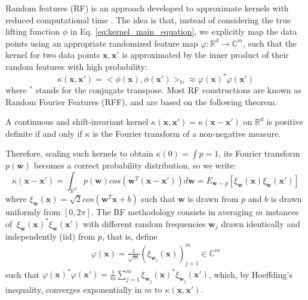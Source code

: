 \documentclass{article}
\begin{document}
Random features (RF) is an approach developed to approximate kernels with reduced computational time  \cite{rahimi2008random}. The idea is that, instead of considering the true lifting function $\phi$ in Eq. \ref{eq:kernel_main_equation}, we explicitly map the data points using an appropriate randomized feature map $\varphi:\mathbb{R}^d \xrightarrow{}\mathbb{C}^m$, such that the kernel for two data points $\mathbf{x}, \mathbf{x}'$ is approximated by the inner product of their random features with high probability:
\begin{equation}
\label{eq:approx_RF}
\kappa(\mathbf{x},\mathbf{x}')=<\phi(\mathbf{x}),\phi(\mathbf{x}')>_\mathbb{H} \approx \varphi(\mathbf{x})^*\varphi(\mathbf{x}')
\end{equation}
where $^*$ stands for the conjugate transpose. Most RF constructions are known as Random Fourier Features (RFF), and are based on
the following theorem.
\begin{theorem}
	A continuous and shift-invariant kernel $\kappa(\mathbf{x},\mathbf{x}')=\kappa(\mathbf{x}-\mathbf{x}')$ on $\mathbb{R}^d$ is positive definite if and only if $\kappa$ is the Fourier transform of a non-negative measure.
\end{theorem}
Therefore, scaling such kernels to obtain $\kappa(0) = \int p = 1$,   its Fourier transform $p(\mathbf{w})$ becomes a correct probability distribution, so we write:
\begin{equation}
\label{eq:real_Fourier_integral}
\kappa(\mathbf{x}-\mathbf{x}')=\int_{\mathbb{R}^d}p(\mathbf{w})cos({\mathbf{w}^T(\mathbf{x}-\mathbf{x}')})d\mathbf{w}=E_{\mathbf{w}\sim p}[ \xi_\mathbf{w}(\mathbf{x}) \xi_\mathbf{w}(\mathbf{x}')]
\end{equation}
where $ \xi_\mathbf{w}(\mathbf{x})=\sqrt{2}cos(\mathbf{w}^T\mathbf{x}+b)$ such that $\mathbf{w}$ is drawn from $p$ and $b$ is drawn uniformly from $[0,2\pi]$. The RF methodology consists in averaging $m$ instances of $\  \xi_\mathbf{w}(\mathbf{x})^*  \xi_\mathbf{w}(\mathbf{x}')$  with different random frequencies $\mathbf{w}_j$ drawn identically and independently (iid) from $p$, that is, define
\begin{align}
	\label{eq:def_RF}
	\varphi(\mathbf{x}) = \frac{1}{\sqrt{m}} ( \xi_{\mathbf{w}_j}(\mathbf{x}) )_{j=1}^m \in \mathbb{C}^m
\end{align}
such that $\varphi(\mathbf{x})^*\varphi(\mathbf{x}')=\frac{1}{m} \sum_{j=1}^m \xi_{\mathbf{w}_j}(\mathbf{x})^*\xi_{\mathbf{w}_j}(\mathbf{x}')$, which, by Hoeffding's inequality, converges exponentially in $m$ to $\kappa(\mathbf{x},\mathbf{x}')$.
\end{document}
